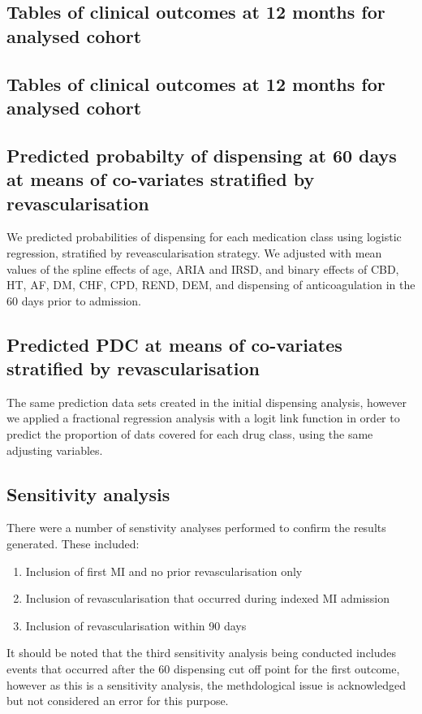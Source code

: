 \documentclass[11pt]{article}
\begin{document}
\subsection{Tables of clinical outcomes at 12 months for analysed cohort}
\color{violet}
\begin{stlog}\end{stlog}
\color{black}
\subsection{Tables of clinical outcomes at 12 months for analysed cohort}
\color{violet}
\begin{stlog}\end{stlog}
\color{black}
\pagebreak
\subsection{Predicted probabilty of dispensing at 60 days at means of co-variates stratified by revascularisation}
We predicted probabilities of dispensing for each medication class using logistic regression, stratified by reveascularisation strategy. We adjusted with mean values of the spline effects of age, ARIA and IRSD, and binary effects of CBD, HT, AF, DM, CHF, CPD, REND, DEM, and dispensing of anticoagulation in the 60 days prior to admission.
\color{violet}
\begin{stlog}\end{stlog}
\color{black}
\pagebreak
\subsection{Predicted PDC at means of co-variates stratified by revascularisation}
The same prediction data sets created in the initial dispensing analysis, however we applied a fractional regression analysis with a logit link function in order to predict the proportion of dats covered for each drug class, using the same adjusting variables. 
\color{violet}
\begin{stlog}\end{stlog}
\color{black}
\pagrebreak
\subsection{Sensitivity analysis}
There were a number of senstivity analyses performed to confirm the results generated. These included: 
\begin{enumerate}
\item Inclusion of first MI and no prior revascularisation only
\item Inclusion of revascularisation that occurred during indexed MI admission
\item Inclusion of revascularisation within 90 days
\end{enumerate}
It should be noted that the third sensitivity analysis being conducted includes events that occurred after the 60 dispensing cut off point for the first outcome, however as this is a sensitivity analysis, the methdological issue is acknowledged but not considered an error for this purpose. 
\end{document}
